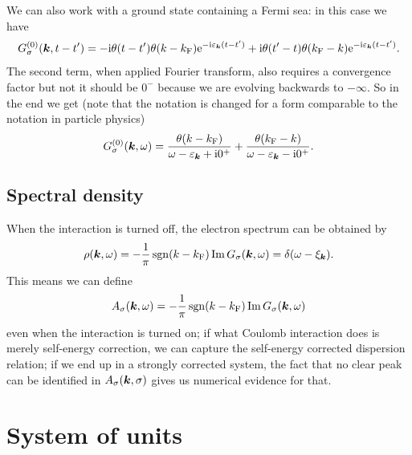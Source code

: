 \documentclass[hyperref, a4paper, 12pt]{report}
\DeclareMathOperator{\sgn}{sgn}
\newcommand*{\ii}{\mathrm{i}}
\newcommand*{\ee}{\mathrm{e}}
\begin{document}
We can also work with a ground state containing a Fermi sea: 
in this case we have 
\begin{equation}
    G^{(0)}_\sigma(\vb*{k}, t - t')
    = - \ii \theta(t - t') \theta(k - k_{\text{F}}) \ee^{- \ii \varepsilon_{\vb*{k}} (t - t')}
    + \ii \theta(t' - t) \theta(k_{\text{F}} - k)  \ee^{- \ii \varepsilon_{\vb*{k}} (t - t')}.
\end{equation}
The second term, when applied Fourier transform,
also requires a convergence factor but not it should be $0^-$
because we are evolving backwards to $-\infty$.
So in the end we get 
(note that the notation is changed for a form comparable to the notation in particle physics)
\begin{equation}
    G^{(0)}_\sigma(\vb*{k}, \omega) = 
    \frac{\theta(k - k_{\text{F}})}{\omega - \varepsilon_{\vb*{k}} + \ii 0^+}
    + \frac{\theta(k_{\text{F}} - k)}{\omega - \varepsilon_{\vb*{k}} - \ii 0^+}.
\end{equation}

\subsection{Spectral density}

When the interaction is turned off, 
the electron spectrum can be obtained by 
\begin{equation}
    \rho(\vb*{k}, \omega) = - \frac{1}{\pi} \sgn(k - k_{\text{F}}) \Im G_{\sigma}(\vb*{k}, \omega)
    = \delta(\omega - \xi_{\vb*{k}}).
\end{equation}
This means we can define 
\begin{equation}
    A_{\sigma}(\vb*{k}, \omega) = - \frac{1}{\pi} \sgn(k - k_{\text{F}}) \Im G_{\sigma}(\vb*{k}, \omega)
\end{equation}
even when the interaction is turned on;
if what Coulomb interaction does is merely self-energy correction,
we can capture the self-energy corrected dispersion relation;
if we end up in a strongly corrected system,
the fact that no clear peak can be identified in $A_\sigma(\vb*{k}, \sigma)$
gives us numerical evidence for that.

\section{System of units}
\end{document}
